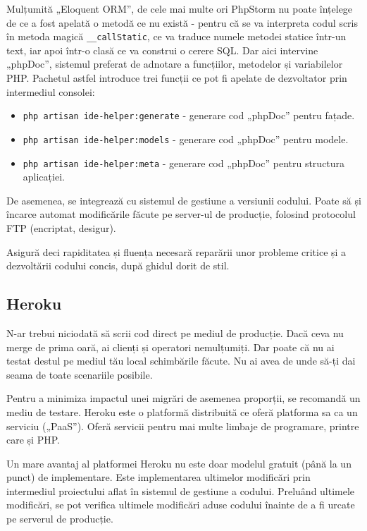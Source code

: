 		Mulțumită „Eloquent ORM”, de cele mai multe ori PhpStorm nu poate înțelege de ce a fost apelată o metodă ce nu există - pentru că se va interpreta codul scris în metoda magică \verb|__callStatic|, ce va traduce numele metodei statice într-un text, iar apoi într-o clasă ce va construi o cerere SQL.
		Dar aici intervine „phpDoc”, sistemul preferat de adnotare a funcțiilor, metodelor și variabilelor PHP.
		Pachetul astfel introduce trei funcții ce pot fi apelate de dezvoltator prin intermediul consolei:
			\begin{itemize}
				\item
				\verb|php artisan ide-helper:generate| - generare cod „phpDoc” pentru fațade.
				\item
				\verb|php artisan ide-helper:models| - generare cod „phpDoc” pentru modele.
				\item
				\verb|php artisan ide-helper:meta| - generare cod „phpDoc” pentru structura aplicației.
			\end{itemize}

		De asemenea, se integrează cu sistemul de gestiune a versiunii codului.
		Poate să și încarce automat modificările făcute pe server-ul de producție, folosind protocolul FTP (encriptat, desigur).

		Asigură deci rapiditatea și fluența necesară reparării unor probleme critice și a dezvoltării codului concis, după ghidul dorit de stil.
	\subsection{Heroku}

		N-ar trebui niciodată să scrii cod direct pe mediul de producție.
		Dacă ceva nu merge de prima oară, ai clienți și operatori nemulțumiți.
		Dar poate că nu ai testat destul pe mediul tău local schimbările făcute.
		Nu ai avea de unde să-ți dai seama de toate scenariile posibile.

		Pentru a minimiza impactul unei migrări de asemenea proporții, se recomandă un mediu de testare.
		Heroku este o platformă distribuită ce oferă platforma sa ca un serviciu („PaaS”).
		Oferă servicii pentru mai multe limbaje de programare, printre care și PHP.

		Un mare avantaj al platformei Heroku nu este doar modelul gratuit (până la un punct) de implementare.
		Este implementarea ultimelor modificări prin intermediul proiectului aflat în sistemul de gestiune a codului.
		Preluând ultimele modificări, se pot verifica ultimele modificări aduse codului înainte de a fi urcate pe serverul de producție.

